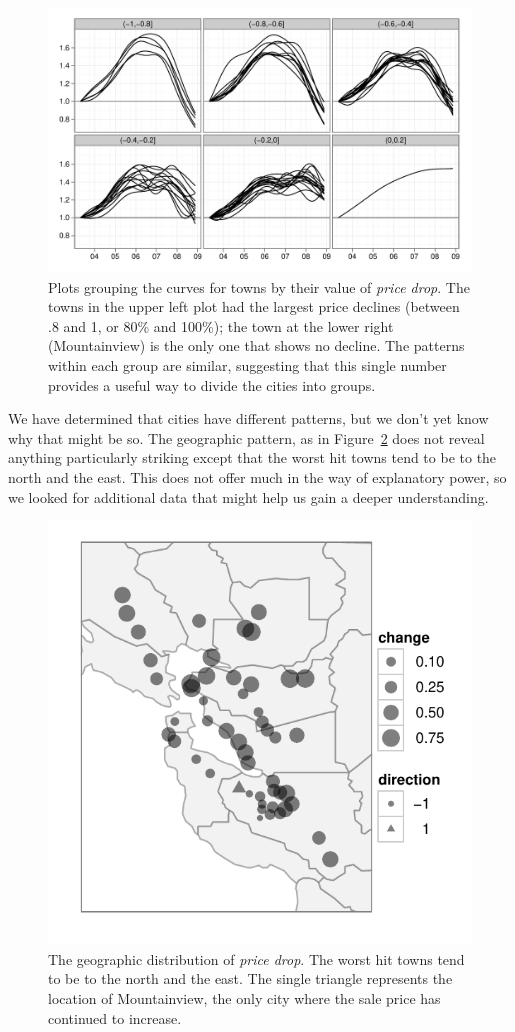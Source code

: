 \documentclass[oneside]{article}
\begin{document}
\begin{figure}[htbp]
  \centering
    \includegraphics[width=0.75\linewidth]{cities-indexed-grouped}
  \caption{Plots grouping the curves for towns by their value of {\em price drop}.  The towns in the upper left plot had the largest price declines (between .8 and 1, or 80\% and 100\%); the town at the lower right (Mountainview) is the only one that shows no decline.  The patterns within each group are similar, suggesting that this single number provides a useful way to divide the cities into groups.}
  \label{fig:groups}
\end{figure}

We have determined that cities have different patterns, but we don't yet know why that might be so.  The geographic pattern, as in Figure~\ref{fig:geo} does not reveal anything particularly striking except that the worst hit towns tend to be to the north and the east. This does not offer much in the way of explanatory power, so we looked for additional data that might help us gain a deeper understanding. 

\begin{figure}[htbp]
  \centering
    \includegraphics[width=0.5\linewidth]{cities-geo-changes}
  \caption{The geographic distribution of {\em price drop}.  The worst hit towns tend to be to the north and the east. The single triangle represents the location of Mountainview, the only city where the sale price has continued to increase. }
  \label{fig:geo}
\end{figure}
\end{document}
